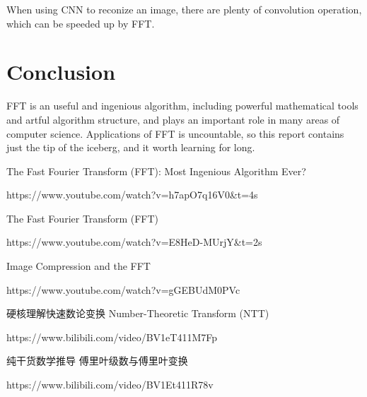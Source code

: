 \documentclass{article}
\begin{document}
When using CNN to reconize an image, there are plenty of convolution operation, which can be speeded up by FFT.

\section{Conclusion}

FFT is an useful and ingenious algorithm, including powerful mathematical tools and artful algorithm structure, and plays an important role in many areas of computer science. Applications of FFT is uncountable, so this report contains just the tip of the iceberg, and it worth learning for long.

\newpage

\renewcommand\refname{References}
\begin{thebibliography}{99}
     The Fast Fourier Transform (FFT): Most Ingenious Algorithm Ever?

    https://www.youtube.com/watch?v=h7apO7q16V0\&t=4s

     The Fast Fourier Transform (FFT)

    https://www.youtube.com/watch?v=E8HeD-MUrjY\&t=2s

     Image Compression and the FFT

    https://www.youtube.com/watch?v=gGEBUdM0PVc
    
     硬核理解快速数论变换 Number-Theoretic Transform (NTT)

    https://www.bilibili.com/video/BV1eT411M7Fp

     纯干货数学推导 傅里叶级数与傅里叶变换

    https://www.bilibili.com/video/BV1Et411R78v
\end{thebibliography}
\end{document}
